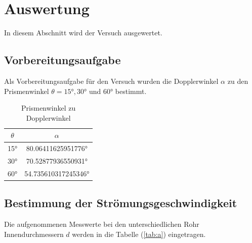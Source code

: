 \newpage
\section{Auswertung}

In diesem Abschnitt wird der Versuch ausgewertet.

\subsection{Vorbereitungsaufgabe}
Als Vorbereitungsaufgabe für den Versuch wurden die Dopplerwinkel $\alpha$ zu den Prismenwinkel $\theta = 15° , 30°$ und $60°$ bestimmt.

\begin{table}
    \centering
    \caption{Prismenwinkel zu Dopplerwinkel}
    \begin{tabular}{c c}
        \toprule
        {$\theta$} & {$\alpha$}  \\
        \midrule
        15° & 80.06411625951776°  \\
        30° & 70.52877936550931°  \\
        60° & 54.735610317245346°  \\
        \bottomrule
    \end{tabular}
    \label{tab:vor}
\end{table}

\subsection{Bestimmung der Strömungsgeschwindigkeit}

Die aufgenommenen Messwerte bei den unterschiedlichen Rohr Innendurchmessern $d$ werden in die Tabelle (\ref{tab:a}) eingetragen.

